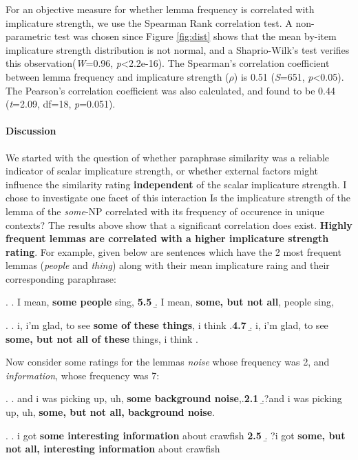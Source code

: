 \documentclass[10pt, biblatex]{report}
\begin{document}
For an objective measure for whether lemma frequency is correlated with implicature
strength, we use the Spearman Rank correlation test. A non-parametric test was
chosen since Figure \ref{fig:dist} shows that the mean by-item implicature strength
distribution is not normal, and a Shaprio-Wilk's test \citep{shapiro_analysis_1965}
verifies this observation(\textit{W}=0.96, \textit{p}<2.2e-16). The Spearman's
correlation coefficient between lemma frequency and implicature strength ($\rho$)
is 0.51 (\textit{S}=651, \textit{p}<0.05). The Pearson's correlation coefficient
was  also calculated, and found to be 0.44 (\textit{t}=2.09, df=18,
\textit{p}=0.051).

\paragraph{Discussion} We started with the question of whether paraphrase
similarity was a reliable indicator of scalar implicature strength, or whether
external factors might influence the similarity rating \textbf{independent} of the
scalar implicature strength. I chose to investigate one facet of this
interaction \dash Is the implicature strength of the lemma of the
\textit{some}-NP correlated with its frequency of occurence in unique contexts?
The results above show that a significant correlation does exist.
\textbf{Highly frequent lemmas are correlated with a higher implicature strength
rating}. For example, given below are sentences which have the 2 most frequent
lemmas (\textit{people} and \textit{thing}) along with their mean implicature
raing and their corresponding paraphrase:

\ex. \a. I mean, \textbf{some people} sing, \hfill \textbf{5.5}
     \b. I mean, \textbf{some, but not all}, people sing,

\ex. \a. i, i'm glad, to see \textbf{some of these things}, i think .\hfill \textbf{4.7}
     \b. i, i'm glad, to see\textbf{ some, but not all of these} things, i think .

Now consider some ratings for the lemmas \textit{noise} whose frequency was 2,
and \textit{information}, whose frequency was 7:

\ex. \a. and i was picking up, uh, \textbf{some background noise},.\hfill \textbf{2.1}
     \b.?and i was picking up, uh, \textbf{some, but not all, background noise}.\label{ex:unacc-a}

\ex. \a. i got \textbf{some interesting information} about crawfish \hfill \textbf{2.5}
     \b. ?i got \textbf{some, but not all, interesting information} about crawfish\label{ex:unacc-b}
\end{document}
